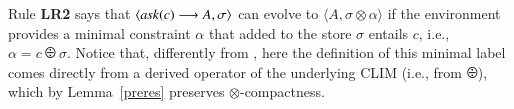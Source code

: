 \documentclass[main.tex]{subfiles}
\begin{document}
Rule {\bf LR2} says that $\langle \mathit{ask}(c) \longrightarrow A, \sigma \rangle$
can evolve to $\langle A, \sigma \otimes \alpha \rangle$ if the environment provides a minimal
constraint $\alpha$ that added to the store $\sigma$ entails $c$, i.e., $\alpha = c \odiv \sigma$.
Notice that, differently from \cite{pippo}, here the definition of this minimal label comes directly
from a derived operator of the underlying CLIM (i.e., from $\odiv$), which by Lemma~\ref{preres} preserves $\otimes$-compactness.
%
%
%
\end{document}
